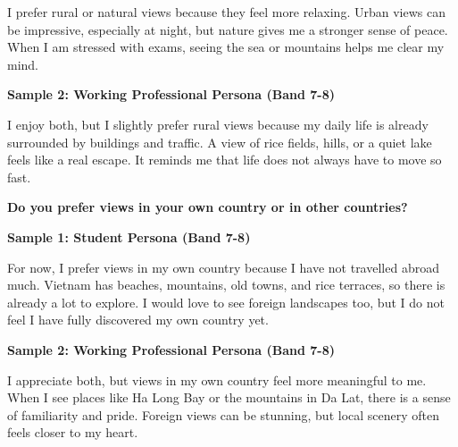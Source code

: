 I prefer rural or natural views because they feel more relaxing. Urban views can be impressive, especially at night, but nature gives me a stronger sense of peace. When I am stressed with exams, seeing the sea or mountains helps me clear my mind.

\textbf{Sample 2: Working Professional Persona (Band 7-8)}

I enjoy both, but I slightly prefer rural views because my daily life is already surrounded by buildings and traffic. A view of rice fields, hills, or a quiet lake feels like a real escape. It reminds me that life does not always have to move so fast.

\separator

\begin{ieltsquestion}
\textbf{Do you prefer views in your own country or in other countries?}
\end{ieltsquestion}
\textbf{Sample 1: Student Persona (Band 7-8)}

For now, I prefer views in my own country because I have not travelled abroad much. Vietnam has beaches, mountains, old towns, and rice terraces, so there is already a lot to explore. I would love to see foreign landscapes too, but I do not feel I have fully discovered my own country yet.

\textbf{Sample 2: Working Professional Persona (Band 7-8)}

I appreciate both, but views in my own country feel more meaningful to me. When I see places like Ha Long Bay or the mountains in Da Lat, there is a sense of familiarity and pride. Foreign views can be stunning, but local scenery often feels closer to my heart.

\separator


